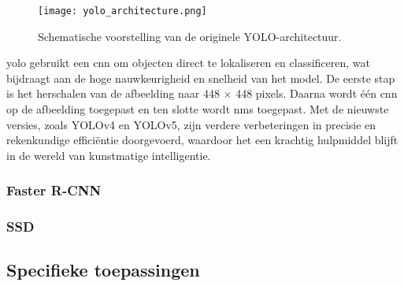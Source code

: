 \begin{figure}[H]
    \centering
    \texttt{[image: yolo\_architecture.png]}
    \caption[Originele YOLO-architectuur.]{\label{fig:yolo_architecture}Schematische voorstelling van de originele YOLO-architectuur. \autocite{Redmon_2016}}
\end{figure}

\gls{yolo} gebruikt een \gls{cnn} om objecten direct te lokaliseren en classificeren, wat bijdraagt aan de hoge nauwkeurigheid en snelheid van het model. De eerste stap is het herschalen van de afbeelding naar 448 $\times$ 448 pixels. Daarna wordt één \gls{cnn} op de afbeelding toegepast en ten slotte wordt \gls{nms} toegepast. Met de nieuwste versies, zoals YOLOv4 en YOLOv5, zijn verdere verbeteringen in precisie en rekenkundige efficiëntie doorgevoerd, waardoor het een krachtig hulpmiddel blijft in de wereld van kunstmatige intelligentie.

\autocite{Chen_2023}
\autocite{Diwan_2022}
\autocite{Jiang_2022}
\autocite{Terven_2023}

\subsubsection{Faster R-CNN}

\lipsum[1]

\autocite{Ren_2015}
\autocite{Wang_2023}
\autocite{Zeng_2021}
\autocite{Yulin_2020}

\subsubsection{SSD}

\lipsum[1]

\autocite{Ma_2020}
\autocite{Kumar_2020}
\autocite{Liu_2016}
\autocite{Jiang_2020}

\subsection{Specifieke toepassingen}

\lipsum[1-3]